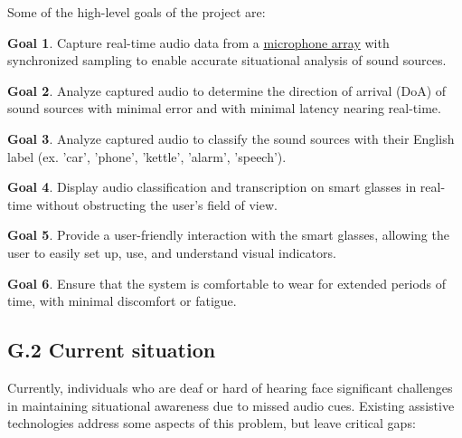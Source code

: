 \documentclass[12pt]{article}
\theoremstyle{definition}
\newtheorem{goal}{Goal}
\begin{document}
Some of the high-level goals of the project are:

\begin{goal}\label{goal:audio_capture}
Capture real-time audio data from a 
\hyperref[def:microphone_array]{microphone array}
with synchronized sampling to enable accurate situational analysis
of sound sources.
\end{goal}

\begin{goal}\label{goal:audio_direction_analysis}
Analyze captured audio to determine the direction of arrival (DoA) of
sound sources with minimal error and with minimal latency nearing real-time.
\end{goal}

\begin{goal}\label{goal:audio_identification_analysis}
Analyze captured audio to classify the sound sources with their English
label (ex. 'car', 'phone', 'kettle', 'alarm', 'speech').
\end{goal}

\begin{goal}\label{goal:visual_display}
Display audio classification and transcription on smart glasses in real-time
without obstructing the user's field of view.
\end{goal}

\begin{goal}\label{goal:user_friendly_interaction}
Provide a user-friendly interaction with the smart glasses,
allowing the user to easily set up, use, and understand visual indicators.
\end{goal}

\begin{goal}\label{goal:user_comfort}
Ensure that the system is comfortable to wear for extended periods of time,
with minimal discomfort or fatigue.
\end{goal}
    
\subsection{G.2 Current situation}

Currently, individuals who are deaf or hard of hearing face significant
challenges in maintaining situational awareness due to missed audio cues.
Existing assistive technologies address some aspects of this problem, but
leave critical gaps:
\end{document}
